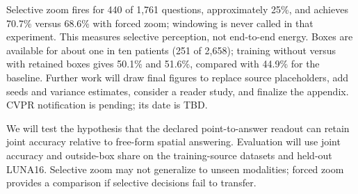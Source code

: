 Selective zoom fires for 440 of 1,761 questions, approximately 25\%, and achieves 70.7\% versus 68.6\% with forced zoom; windowing is never called in that experiment. This measures selective perception, not end-to-end energy. Boxes are available for about one in ten patients (251 of 2,658); training without versus with retained boxes gives 50.1\% and 51.6\%, compared with 44.9\% for the baseline. Further work will draw final figures to replace source placeholders, add seeds and variance estimates, consider a reader study, and finalize the appendix. CVPR notification is pending; its date is TBD.

We will test the hypothesis that the declared point-to-answer readout can retain joint accuracy relative to free-form spatial answering. Evaluation will use joint accuracy and outside-box share on the training-source datasets and held-out LUNA16. Selective zoom may not generalize to unseen modalities; forced zoom provides a comparison if selective decisions fail to transfer.

